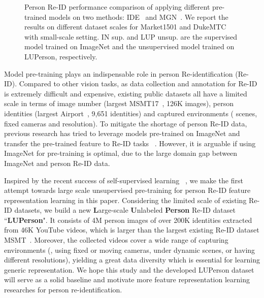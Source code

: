 \documentclass[final]{cvpr}
\begin{document}
\begin{figure}[t]
\begin{center}
\end{center}
\vspace{-0.4cm}
\caption{Person Re-ID performance comparison of applying different pre-trained models on two methods: IDE~\cite{zheng2017person} and MGN~\cite{wang2018learning}. We report the results on different dataset scales for Market1501 and DukeMTC with small-scale setting. IN sup. and LUP unsup. are the supervised model trained on ImageNet and the unsupervised model trained on LUPerson, respectively.}
\vspace{-0.5cm}
\label{fig:onecol}
\end{figure}

Model pre-training plays an indispensable role in person Re-identification (Re-ID). Compared to other vision tasks, as data collection and annotation for Re-ID is extremely difficult and expensive, existing public datasets all have a limited scale in terms of image number (largest MSMT17~\cite{wei2018person}, 126K images), person identities (largest Airport~\cite{karanam2016comprehensive}, 9,651 identities) and captured environments ( scenes, fixed cameras and resolution). To mitigate the shortage of person Re-ID data, previous research has tried to leverage models pre-trained on ImageNet and transfer the pre-trained feature to Re-ID tasks ~\cite{hermans2017defense, chen2018group, suh2018part, wang2018learning,fu2020improving}. However, it is arguable if using ImageNet for pre-training is optimal, due to the large domain gap between ImageNet and person Re-ID data.

Inspired by the recent success of self-supervised learning ~\cite{chen2020simple,chen2020mocov2,he2020momentum}, we make the first attempt towards large scale unsupervised pre-training for person Re-ID feature representation learning in this paper. Considering the limited scale of existing Re-ID datasets, we build a new \textbf{L}arge-scale \textbf{U}nlabeled \textbf{Person} Re-ID dataset ``\textbf{LUPerson}". It consists of 4M person images of over 200K identities extracted from 46K YouTube videos, which is  larger than the largest existing Re-ID dataset MSMT~\cite{wei2018person}. Moreover, the collected videos cover a wide range of capturing environments (\eg, using fixed or moving cameras, under dynamic scenes, or having different resolutions), yielding a great data diversity which is essential for learning generic representation.
We hope this study and the developed LUPerson dataset will serve as a solid baseline and motivate more feature representation learning researches for person re-identification.
\end{document}

